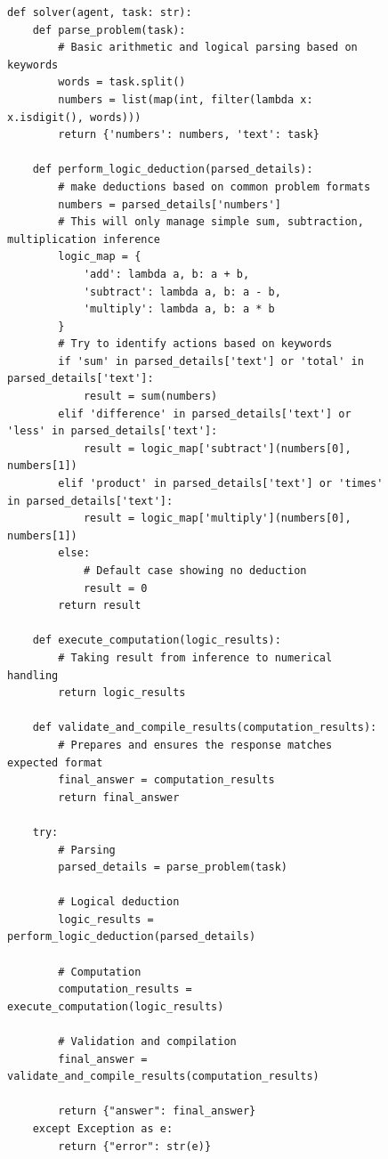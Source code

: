 \documentclass[11pt]{article}
\newcommand{\framework}{Gödel Agent\xspace}
\begin{document}
\newpage
\begin{figure}[ht]
\begin{lstlisting}[style=pythonstyle, caption={Policy at 6th Iteration found by \framework for MGSM.}]
def solver(agent, task: str):
    def parse_problem(task):
        # Basic arithmetic and logical parsing based on keywords
        words = task.split()
        numbers = list(map(int, filter(lambda x: x.isdigit(), words)))
        return {'numbers': numbers, 'text': task}

    def perform_logic_deduction(parsed_details):
        # make deductions based on common problem formats
        numbers = parsed_details['numbers']
        # This will only manage simple sum, subtraction, multiplication inference
        logic_map = {
            'add': lambda a, b: a + b,
            'subtract': lambda a, b: a - b,
            'multiply': lambda a, b: a * b
        }
        # Try to identify actions based on keywords
        if 'sum' in parsed_details['text'] or 'total' in parsed_details['text']:
            result = sum(numbers)
        elif 'difference' in parsed_details['text'] or 'less' in parsed_details['text']:
            result = logic_map['subtract'](numbers[0], numbers[1])
        elif 'product' in parsed_details['text'] or 'times' in parsed_details['text']:
            result = logic_map['multiply'](numbers[0], numbers[1])
        else:
            # Default case showing no deduction
            result = 0
        return result

    def execute_computation(logic_results):
        # Taking result from inference to numerical handling
        return logic_results

    def validate_and_compile_results(computation_results):
        # Prepares and ensures the response matches expected format
        final_answer = computation_results
        return final_answer

    try:
        # Parsing
        parsed_details = parse_problem(task)

        # Logical deduction
        logic_results = perform_logic_deduction(parsed_details)

        # Computation
        computation_results = execute_computation(logic_results)

        # Validation and compilation
        final_answer = validate_and_compile_results(computation_results)

        return {"answer": final_answer}
    except Exception as e:
        return {"error": str(e)}
\end{lstlisting}
\end{figure}
\end{document}
